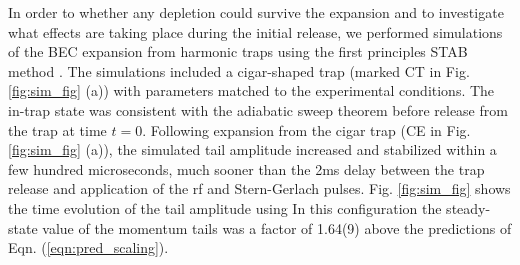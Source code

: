 	In order to  whether any depletion could survive the expansion and to investigate what effects are taking place during the initial release, we performed simulations of the BEC expansion from harmonic traps using the first principles STAB method \cite{Deuar11,Kheruntsyan12}. 
	The simulations included a cigar-shaped trap (marked CT in Fig. \ref{fig:sim_fig} (a)) with parameters matched to the experimental conditions. 
	The in-trap state was consistent with the adiabatic sweep theorem before release from the trap at time $t=0$. 
	Following expansion from the cigar trap (CE in Fig. \ref{fig:sim_fig} (a)), the simulated tail amplitude increased and stabilized within a few hundred microseconds, much sooner than the 2ms delay between the trap release and application of the rf and Stern-Gerlach pulses. 
	Fig. \ref{fig:sim_fig} shows the time evolution of the tail amplitude  %
	using   
	In this configuration the steady-state value of the momentum tails was a factor of 1.64(9) above the predictions of Eqn. (\ref{eqn:pred_scaling}). 

